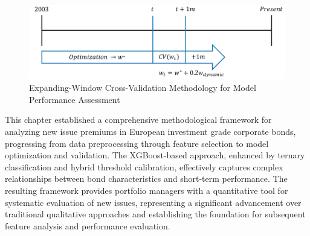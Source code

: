 \begin{figure}[h]
    \begin{center}
        \includegraphics[width=\textwidth]{images/backtest_timeline.pdf}
    \end{center}
    \caption{Expanding-Window Cross-Validation Methodology for Model Performance Assessment}
    \label{fig:backtest_timeline}
\end{figure}

This chapter established a comprehensive methodological framework for analyzing new issue premiums in European investment grade corporate bonds, progressing from data preprocessing through feature selection to model optimization and validation. The XGBoost-based approach, enhanced by ternary classification and hybrid threshold calibration, effectively captures complex relationships between bond characteristics and short-term performance. The resulting framework provides portfolio managers with a quantitative tool for systematic evaluation of new issues, representing a significant advancement over traditional qualitative approaches and establishing the foundation for subsequent feature analysis and performance evaluation.